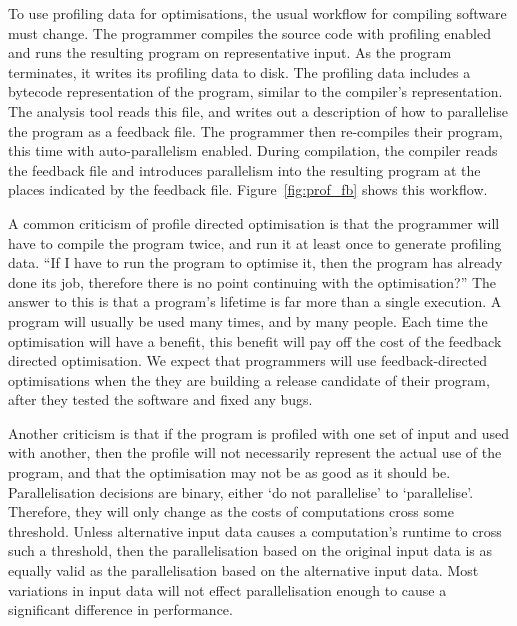 To use profiling data for optimisations,
the usual workflow for compiling software must change.
The programmer compiles the source code with profiling enabled and runs the
resulting program on representative input.
As the program terminates,
it writes its profiling data to disk.
The profiling data includes a bytecode representation of the program,
similar to the compiler's representation.
The analysis tool reads this file,
and writes out a description of how to parallelise the program as a feedback
file.
The programmer then re-compiles their program,
this time with auto-parallelism enabled.
During compilation,
the compiler reads the feedback file and introduces parallelism into the
resulting program at the places indicated by the feedback file.
Figure~\ref{fig:prof_fb} shows this workflow.


A common criticism of profile directed optimisation is that the programmer will
have to compile the program twice,
and run it at least once to generate profiling data.
``If I have to run the program to optimise it, then the program has
already done its job,
therefore there is no point continuing with the optimisation?''
The answer to this is that a program's lifetime is far more than a
single execution.
A program will usually be used many times, and by many people.
Each time the optimisation will have a benefit,
this benefit will pay off the cost of the feedback directed optimisation.
We expect that programmers will use feedback-directed optimisations when the
they are building a release candidate of their program,
after they tested the software and fixed any bugs.

Another criticism is that if the program is profiled with one set of input and
used with another,
then the profile will not necessarily represent the actual use
of the program,
and that the optimisation may not be as good as it should be.
Parallelisation decisions are binary,
either `do not parallelise' to `parallelise'.
Therefore,
they will only change as the costs of computations cross some threshold.
Unless alternative input data causes a computation's runtime to cross such a
threshold,
then the parallelisation based on the original input data is 
as equally valid as the parallelisation based on the alternative input data.
Most variations in input data will not  
effect parallelisation enough to cause a significant difference in performance.

